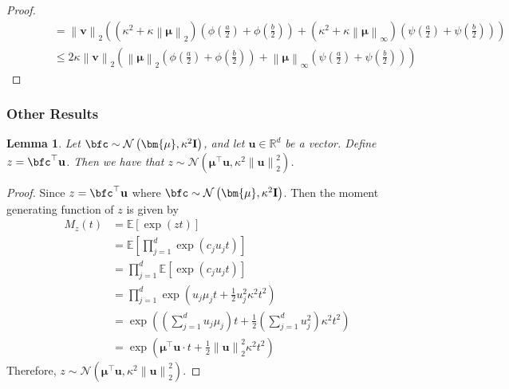 \documentclass[10pt]{article} %
\newtheorem{lemma}[theorem]{Lemma}
\theoremstyle{definition}
\theoremstyle{plain}
\newcommand{\paren}[1]{\left(#1\right)}
\newcommand{\norm}[1]{\left\|#1\right\|}
\providecommand{\E}{\mathbb{E}}
\providecommand{\R}{\mathbb{R}}
\def\bfI{{\mathbf{I}}}\def\bfJ{{\mathbf{J}}}\def\bfK{{\mathbf{K}}}\def\bfL{{\mathbf{L}}}
\def\bfu{{\mathbf{u}}}\def\bfv{{\mathbf{v}}}\def\bfw{{\mathbf{w}}}\def\bfx{{\mathbf{x}}}
\begin{document}
\begin{proof}
\begin{align*}
        & \quad\quad\quad = \norm{\bfv}_2\paren{\paren{\kappa^2 + \kappa\norm{\bm{\mu}}_2}\paren{\phi\paren{\frac{a}{2}} + \phi\paren{\frac{b}{2}}} + \paren{\kappa^2+\kappa\norm{\bm{\mu}}_{\infty}}\paren{\psi\paren{\frac{a}{2}} + \psi\paren{\frac{b}{2}}}}\\
        & \quad\quad\quad \leq 2\kappa\norm{\bfv}_2\paren{\norm{\bm{\mu}}_2\paren{\phi\paren{\frac{a}{2}} + \phi\paren{\frac{b}{2}}} + \norm{\bm{\mu}}_{\infty}\paren{\psi\paren{\frac{a}{2}} + \psi\paren{\frac{b}{2}}}}
    \end{align*}
\end{proof}

\subsubsection{Other Results}
\begin{lemma}
    \label{lem:inner_gaussian_rv}
    Let $\bfc\sim\mathcal{N}\paren{\bm{\mu},\kappa^2\bfI}$, and let $\bfu\in\R^d$ be a vector. Define $z = \bfc^\top\bfu$. Then we have that $z\sim\mathcal{N}\paren{\bm{\mu}^\top\bfu,\kappa^2\norm{\bfu}_2^2}$.
\end{lemma}
\begin{proof}
    Since $z = \bfc^\top\bfu$ where $\bfc\sim\mathcal{N}\paren{\bm{\mu},\kappa^2\bfI}$. Then the moment generating function of $z$ is given by
    \begin{align*}
        M_z(t) & = \E\left[\exp\paren{zt}\right]\\
        & = \E\left[\prod_{j=1}^d\exp\paren{c_ju_jt}\right]\\
        & = \prod_{j=1}^d\E\left[\exp\paren{c_ju_jt}\right]\\
        & = \prod_{j=1}^d\exp\paren{u_j\mu_jt + \frac{1}{2}u_j^2\kappa^2t^2} \\
        & = \exp\paren{\paren{\sum_{j=1}^du_j\mu_j}t + \frac{1}{2}\paren{\sum_{j=1}^du_j^2}\kappa^2t^2}\\
        & = \exp\paren{\bm{\mu}^\top\bfu\cdot t + \frac{1}{2}\norm{\bfu}_2^2\kappa^2t^2}
    \end{align*}
    Therefore, $z\sim\mathcal{N}\paren{\bm{\mu}^\top\bfu,\kappa^2\norm{\bfu}_2^2}$.
\end{proof}
\end{document}

